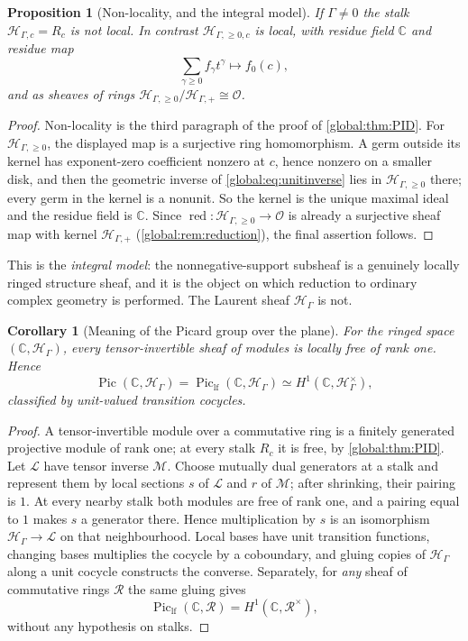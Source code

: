 \documentclass[11pt,letterpaper]{article}
\newtheorem{proposition}[proposition]{Proposition}
\newtheorem{corollary}[corollary]{Corollary}
\theoremstyle{definition}
\theoremstyle{remark}
\newcommand{\C}{\mathbb C}
\newcommand{\OO}{\mathcal O}
\newcommand{\HH}{\mathscr H_\Gamma}
\newcommand{\HP}{\mathscr H_{\Gamma,+}}
\newcommand{\HI}{\mathscr H_{\Gamma,\ge0}}
\newcommand{\red}{\operatorname{red}}
\newcommand{\Pic}{\operatorname{Pic}}
\newcommand{\Piclf}{\operatorname{Pic}_{\mathrm{lf}}}
\numberwithin{equation}{section}
\begin{document}
\begin{proposition}[Non-locality, and the integral model]\label{global:prop:nonlocal}
If $\Gamma\ne0$ the stalk $\mathscr H_{\Gamma,c}=R_c$ is not local. In contrast $\mathscr H_{\Gamma,\ge0,c}$ \emph{is} local, with residue field $\C$ and residue map
\[
  \sum_{\gamma\ge0}f_\gamma t^\gamma\longmapsto f_0(c),
\]
and as sheaves of rings $\HI/\HP\cong\OO$.
\end{proposition}

\begin{proof}
Non-locality is the third paragraph of the proof of \cref{global:thm:PID}. For $\HI$, the displayed map is a surjective ring homomorphism. A germ outside its kernel has exponent-zero coefficient nonzero at $c$, hence nonzero on a smaller disk, and then the geometric inverse of \eqref{global:eq:unitinverse} lies in $\HI$ there; every germ in the kernel is a nonunit. So the kernel is the unique maximal ideal and the residue field is $\C$. Since $\red:\HI\to\OO$ is already a surjective sheaf map with kernel $\HP$ (\cref{global:rem:reduction}), the final assertion follows.
\end{proof}

This is the \emph{integral model}: the nonnegative-support subsheaf is a genuinely locally ringed structure sheaf, and it is the object on which reduction to ordinary complex geometry is performed. The Laurent sheaf $\HH$ is not.

\begin{corollary}[Meaning of the Picard group over the plane]\label{global:cor:Picmeaning}
For the ringed space $(\C,\HH)$, every tensor-invertible sheaf of modules is locally free of rank one. Hence
\[
  \Pic(\C,\HH)=\Piclf(\C,\HH)\simeq H^1(\C,\HH^\times),
\]
classified by unit-valued transition cocycles.
\end{corollary}

\begin{proof}
A tensor-invertible module over a commutative ring is a finitely generated projective module of rank one; at every stalk $R_c$ it is free, by \cref{global:thm:PID}. Let $\mathcal L$ have tensor inverse $\mathcal M$. Choose mutually dual generators at a stalk and represent them by local sections $s$ of $\mathcal L$ and $r$ of $\mathcal M$; after shrinking, their pairing is $1$. At every nearby stalk both modules are free of rank one, and a pairing equal to $1$ makes $s$ a generator there. Hence multiplication by $s$ is an isomorphism $\HH\to\mathcal L$ on that neighbourhood. Local bases have unit transition functions, changing bases multiplies the cocycle by a coboundary, and gluing copies of $\HH$ along a unit cocycle constructs the converse. Separately, for \emph{any} sheaf of commutative rings $\mathscr R$ the same gluing gives
\begin{equation}\label{global:eq:lfclassification}
  \Piclf(\C,\mathscr R)=H^1(\C,\mathscr R^\times),
\end{equation}
without any hypothesis on stalks.
\end{proof}
\end{document}
